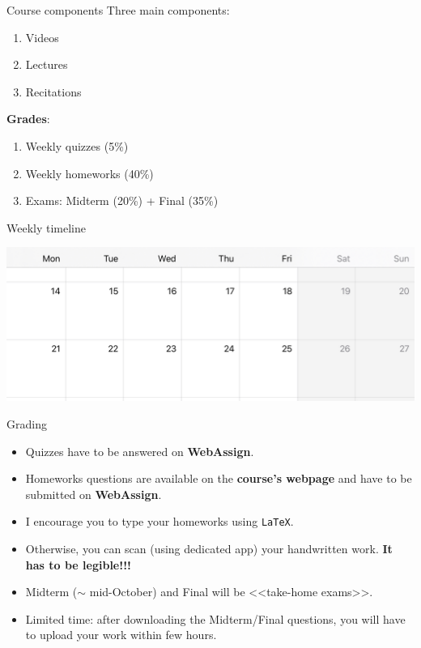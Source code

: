 \documentclass{beamer}
\begin{document}
\begin{frame}[t]{Course components}
	Three main components:
	\begin{enumerate}
		\item Videos 
		\item Lectures 
		\item Recitations 
	\end{enumerate}

	\vspace{0.5cm}
	\pause
	\textbf{Grades}:
	\begin{enumerate}
		\item Weekly quizzes (5\%)
		\item Weekly homeworks (40\%)
		\item Exams: Midterm (20\%) + Final (35\%)
	\end{enumerate}

\end{frame}
\begin{frame}{Weekly timeline}
	\begin{center}
		\includegraphics[width=\textwidth]{./timetable.jpg}
	\end{center}
\end{frame}

\begin{frame}{Grading}
	\begin{itemize}
		\item Quizzes have to be answered on \textbf{WebAssign}.
		\item Homeworks questions are available on the \textbf{course's webpage} and have to be submitted on \textbf{WebAssign}.
			\pause
		\item I encourage you to type your homeworks using \texttt{LaTeX}.
		\item Otherwise, you can scan (using dedicated app) your handwritten work.
			{\bf It has to be legible!!!}
			\pause
		\item Midterm ($\sim$ mid-October) and Final will be <<take-home exams>>.
		\item Limited time: after downloading the Midterm/Final questions, you will have to upload your work within few hours.
	\end{itemize}
\end{frame}
\end{document}

